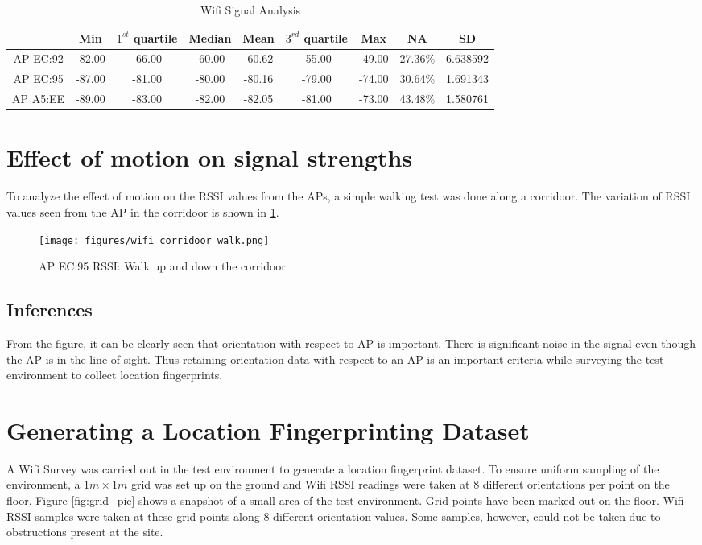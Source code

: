 \begin{table}
\centering
\begin{tabular}{c c c c c c c c c}
\hline
\hline
 & Min & $1^{st}$ quartile & Median & Mean & $3^{rd}$ quartile & Max & NA & SD\\
\hline
AP EC:92 & -82.00 & -66.00 & -60.00 & -60.62 & -55.00 & -49.00 & 27.36\% & 6.638592\\
AP EC:95 & -87.00 & -81.00 & -80.00 & -80.16 & -79.00 & -74.00 & 30.64\% & 1.691343\\
AP A5:EE & -89.00 & -83.00 & -82.00 & -82.05 & -81.00 & -73.00 & 43.48\% & 1.580761\\
\hline
\end{tabular}
\caption{Wifi Signal Analysis\label{tbl:wifi_signal_analysis}}
\end{table}

\section{Effect of motion on signal strengths}

To analyze the effect of motion on the RSSI values from the APs, a simple walking
test was done along a corridoor. The variation of RSSI values seen from the AP in
the corridoor is shown in \ref{fig:wifi_corridoor_walk}.

\begin{figure}\centering
    \texttt{[image: figures/wifi\_corridoor\_walk.png]}
    \caption{AP EC:95 RSSI: Walk up and down the corridoor\label{fig:wifi_corridoor_walk}}
\end{figure}


\subsection{Inferences}
From the figure, it can be clearly seen that orientation with respect to 
AP is important. There is significant noise in the signal even though the AP 
is in the line of sight. Thus retaining orientation data with respect to 
an AP is an important criteria while surveying the test environment to 
collect location fingerprints.

\section{Generating a Location Fingerprinting Dataset}

A Wifi Survey was carried out in the test environment to generate a location 
fingerprint dataset. To ensure uniform sampling of the environment, 
a $1m \times 1m$ grid was set up on the ground and Wifi RSSI readings were taken 
at 8 different orientations per point on the floor. 
Figure \ref{fig:grid_pic} shows a snapshot of a small area of the test environment.
Grid points have been marked out on the floor. 
Wifi RSSI samples were taken at these grid points along 8 different orientation 
values. Some samples, however, could not be taken due to obstructions 
present at the site.

